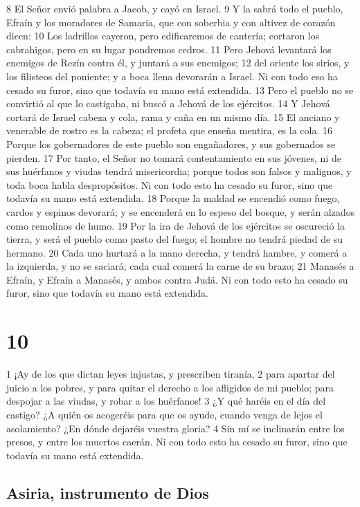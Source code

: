 8 El Señor envió palabra a Jacob, y cayó en Israel.
9 Y la sabrá todo el pueblo, Efraín y los moradores de Samaria, que con soberbia y con altivez de corazón dicen:
10 Los ladrillos cayeron, pero edificaremos de cantería; cortaron los cabrahigos, pero en su lugar pondremos cedros.
11 Pero Jehová levantará los enemigos de Rezín contra él, y juntará a sus enemigos;
12 del oriente los sirios, y los filisteos del poniente; y a boca llena devorarán a Israel. Ni con todo eso ha cesado su furor, sino que todavía su mano está extendida.
13 Pero el pueblo no se convirtió al que lo castigaba, ni buscó a Jehová de los ejércitos.
14 Y Jehová cortará de Israel cabeza y cola, rama y caña en un mismo día.
15 El anciano y venerable de rostro es la cabeza; el profeta que enseña mentira, es la cola.
16 Porque los gobernadores de este pueblo son engañadores, y sus gobernados se pierden.
17 Por tanto, el Señor no tomará contentamiento en sus jóvenes, ni de sus huérfanos y viudas tendrá misericordia; porque todos son falsos y malignos, y toda boca habla despropósitos. Ni con todo esto ha cesado su furor, sino que todavía su mano está extendida.
18 Porque la maldad se encendió como fuego, cardos y espinos devorará; y se encenderá en lo espeso del bosque, y serán alzados como remolinos de humo.
19 Por la ira de Jehová de los ejércitos se oscureció la tierra, y será el pueblo como pasto del fuego; el hombre no tendrá piedad de su hermano.
20 Cada uno hurtará a la mano derecha, y tendrá hambre, y comerá a la izquierda, y no se saciará; cada cual comerá la carne de su brazo;
21 Manasés a Efraín, y Efraín a Manasés, y ambos contra Judá. Ni con todo esto ha cesado su furor, sino que todavía su mano está extendida.

\chapter{10}

1 ¡Ay de los que dictan leyes injustas, y prescriben tiranía,
2 para apartar del juicio a los pobres, y para quitar el derecho a los afligidos de mi pueblo; para despojar a las viudas, y robar a los huérfanos!
3 ¿Y qué haréis en el día del castigo? ¿A quién os acogeréis para que os ayude, cuando venga de lejos el asolamiento? ¿En dónde dejaréis vuestra gloria?
4 Sin mí se inclinarán entre los presos, y entre los muertos caerán. Ni con todo esto ha cesado su furor, sino que todavía su mano está extendida.

\section*{Asiria, instrumento de Dios}

